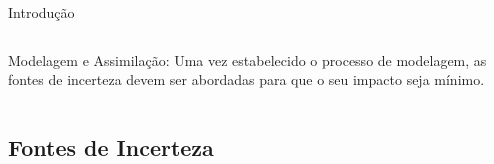 \documentclass[10pt,aspectratio=169]{beamer}
\begin{document}
\begin{frame}[fragile]{Introdução}
\begin{columns}
	\vspace{2em}
  \begin{block}{Modelagem e Assimilação:}
  \vspace{0.5em}
   Uma vez estabelecido o processo de modelagem, as fontes de incerteza devem ser abordadas para que o seu impacto seja mínimo.
  \end{block}
  \end{columns} 
\end{frame}


\subsection{Fontes de Incerteza}
\end{document}
